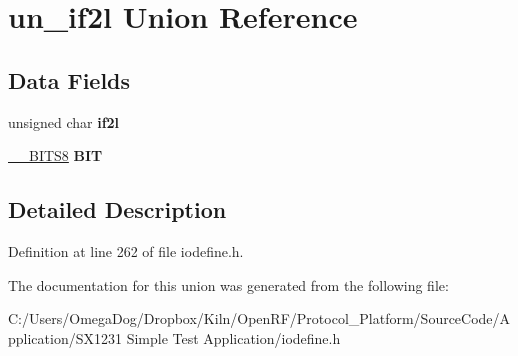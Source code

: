 \hypertarget{unionun__if2l}{\section{un\-\_\-if2l Union Reference}
\label{unionun__if2l}
}
\subsection*{Data Fields}
\begin{DoxyCompactItemize}
\item 
\hypertarget{unionun__if2l_a63e9c7ac17c796d317a8eff7a40d0462}{unsigned char {\bfseries if2l}}\label{unionun__if2l_a63e9c7ac17c796d317a8eff7a40d0462}

\item 
\hypertarget{unionun__if2l_a84b558f0a2b5426cfd0191305286209f}{\hyperlink{struct_____b_i_t_s8}{\-\_\-\-\_\-\-B\-I\-T\-S8} {\bfseries B\-I\-T}}\label{unionun__if2l_a84b558f0a2b5426cfd0191305286209f}

\end{DoxyCompactItemize}


\subsection{Detailed Description}


Definition at line 262 of file iodefine.\-h.



The documentation for this union was generated from the following file\-:\begin{DoxyCompactItemize}
\item 
C\-:/\-Users/\-Omega\-Dog/\-Dropbox/\-Kiln/\-Open\-R\-F/\-Protocol\-\_\-\-Platform/\-Source\-Code/\-Application/\-S\-X1231 Simple Test Application/iodefine.\-h\end{DoxyCompactItemize}
